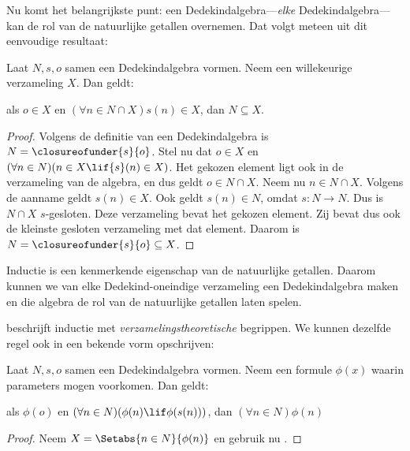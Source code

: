 \documentclass[../../../include/open-logic-section]{subfiles}
\begin{document}

Nu komt het belangrijkste punt: een Dedekindalgebra---\emph{elke}
Dedekindalgebra---kan de rol van de natuurlijke getallen overnemen. Dat
volgt meteen uit dit eenvoudige resultaat:

\begin{thm}
Laat $N, s, o$ samen een Dedekindalgebra vormen. Neem een willekeurige
verzameling $X$. Dan geldt:
	\begin{center}
		als $o \in X$ en $(\forall {n} \in N \cap X){s}({n}) \in X$, {dan} $N \subseteq X$.
	\end{center}
\end{thm}

\begin{proof}
Volgens de definitie van een Dedekindalgebra is $N =
\closureofunder{s}{o}$. Stel nu dat ${o} \in X$ en $(\forall {n} \in
N)(n \in X \lif {s}({n}) \in X)$. Het gekozen element ligt ook in
de verzameling van de algebra, en dus geldt ${o} \in N \cap X$.
Neem nu ${n} \in N \cap X$.
Volgens de aanname geldt ${s}({n}) \in X$. Ook geldt
${s}({n}) \in N$, omdat $s \colon N \to N$. Dus is $N \cap X$
$s$-gesloten. Deze verzameling bevat het gekozen element. Zij bevat dus
ook de kleinste gesloten verzameling met dat element. Daarom is $N =
\closureofunder{s}{o} \subseteq X$.
\end{proof}

Inductie is een kenmerkende eigenschap van de natuurlijke getallen.
Daarom kunnen we van elke Dedekind-oneindige verzameling een
Dedekindalgebra maken en die algebra de rol van de natuurlijke getallen
laten spelen.

 beschrijft inductie met
\emph{verzamelingstheoretische} begrippen. We kunnen dezelfde regel
ook in een bekende vorm opschrijven:

\begin{cor}
Laat $N, s, o$ samen een Dedekindalgebra vormen. Neem een formule
$\phi(x)$ waarin parameters mogen voorkomen. Dan geldt:
\begin{center}
	als $\phi(o)$ en $(\forall {n} \in N)(\phi(n)\lif
	\phi({s}({n})))$, {dan} $(\forall n \in N)\phi(n)$
\end{center}
\end{cor}

\begin{proof}
Neem $X = \Setabs{n \in N}{\phi(n)}$ en gebruik nu
.
\end{proof}
\end{document}

